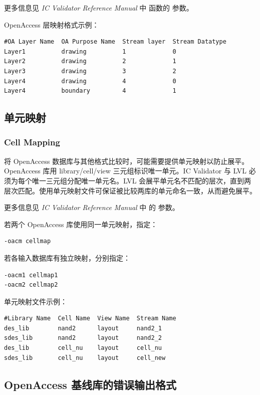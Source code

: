 更多信息见 \textit{IC Validator Reference Manual} 中  函数的  参数。

OpenAccess 层映射格式示例：
\begin{lstlisting}
#OA Layer Name  OA Purpose Name  Stream layer  Stream Datatype
Layer1          drawing          1             0
Layer2          drawing          2             1
Layer3          drawing          3             2
Layer4          drawing          4             0
Layer4          boundary         4             1
\end{lstlisting}

\subsection{单元映射}
\subsubsection*{Cell Mapping}

将 OpenAccess 数据库与其他格式比较时，可能需要提供单元映射以防止展平。OpenAccess 库用 library/cell/view 三元组标识唯一单元。IC Validator 与 LVL 必须为每个唯一三元组分配唯一单元名。LVL 会展平单元名不匹配的层次，直到两层次匹配。使用单元映射文件可保证被比较两库的单元命名一致，从而避免展平。

更多信息见 \textit{IC Validator Reference Manual} 中  的  参数。

若两个 OpenAccess 库使用同一单元映射，指定：
\begin{lstlisting}
-oacm cellmap
\end{lstlisting}

若各输入数据库有独立映射，分别指定：
\begin{lstlisting}
-oacm1 cellmap1
-oacm2 cellmap2
\end{lstlisting}

单元映射文件示例：
\begin{lstlisting}
#Library Name  Cell Name  View Name  Stream Name
des_lib        nand2      layout     nand2_1
sdes_lib       nand2      layout     nand2_2
des_lib        cell_nu    layout     cell_nu
sdes_lib       cell_nu    layout     cell_new
\end{lstlisting}

\subsection{OpenAccess 基线库的错误输出格式}
